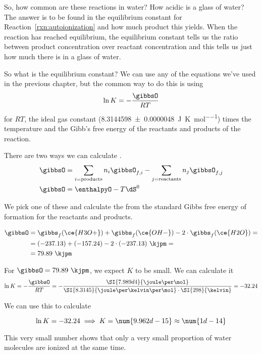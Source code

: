 \documentclass[../mit-general-chemistry.tex]{subfiles}
\begin{document}
So, how common are these reactions in water? How acidic is a glass of
water? The answer is to be found in the equilibrium constant for
Reaction~\ref{rxn:autoionization} and how much product this
yields. When the reaction has reached equilibrium, the equilibrium
constant tells us the ratio between product concentration over
reactant concentration and this tells us just how much  there
is in a glass of water.

So what is the equilibrium constant? We can use any of the equations
we've used in the previous chapter, but the common way to do this is
using
\begin{equation*}
  \ln K = - \frac{\gibbsO}{RT}
\end{equation*}
for $RT$, the ideal gas constant
(\SI{8.3144598(48)}{\joule\per\kelvin\per\mol}) times the temperature
and \gibbsO the Gibb's free energy of the reactants and products of
the reaction.

There are two ways we can calculate \gibbsO.
\begin{align*}
  &\gibbsO = \sum_{i = \text{products}} n_i \gibbsO_{f,i}
  - \sum_{j = \text{reactants}} n_j \gibbsO_{f,j} \\
  &\gibbsO = \enthalpyO - T\dS^0
\end{align*}

We pick one of these and calculate the \gibbsO from the standard Gibbs
free energy of formation for the reactants and products.

\begin{align*}
  \gibbsO &= \gibbs_f(\ce{H3O+}) + \gibbs_f(\ce{OH-}) - 2\cdot\gibbs_f(\ce{H2O}) = \\
  &= (-237.13) + (-157.24) - 2\cdot(-237.13)~\kjpm = \\
  &= 79.89~\kjpm
\end{align*}

For $\gibbsO = 79.89~\kjpm$, we expect $K$ to be small. We can
calculate it
\begin{equation*}
  \ln K = -\frac{\gibbsO}{RT}
  = -
  \frac{\SI{7.989d4}{\joule\per\mol}}{\SI{8.3145}{\joule\per\kelvin\per\mol}\cdot\SI{298}{\kelvin}}
  = -32.24
\end{equation*}

We can use this to calculate

\begin{equation*}
  \ln K = -32.24 \implies K = \num{9.962d-15} \approx \num{1d-14}
\end{equation*}

This very small number shows that only a very small proportion of
water molecules are ionized at the same time.
\end{document}
